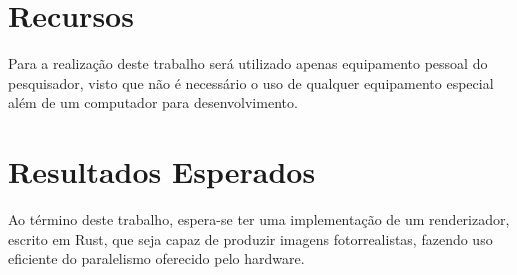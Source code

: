 \documentclass[12pt]{article}
\begin{document}
\section{Recursos}

Para a realização deste trabalho será utilizado apenas equipamento pessoal do pesquisador, visto que
não é necessário o uso de qualquer equipamento especial além de um computador para desenvolvimento.

\section{Resultados Esperados}

Ao término deste trabalho, espera-se ter uma implementação de um renderizador, escrito em Rust, que
seja capaz de produzir imagens fotorrealistas, fazendo uso eficiente do paralelismo oferecido pelo
hardware.



\end{document}
